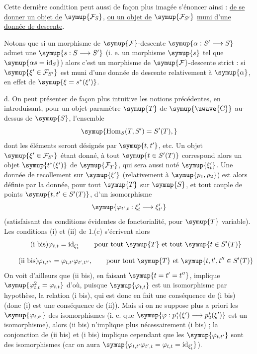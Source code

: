 Cette dernière condition peut aussi de façon plus imagée s'énoncer ainsi :
 \uline{de se donner un objet de} $\symup{\mathcal F_S}$, \uline{ou un objet de}
$\symup{\mathcal F_{S'}}$ \uline{muni d'une donnée de descente}.

Notons que si un morphisme de $\symup{\mathcal F}$-descente $\symup{\alpha:S'\longrightarrow S}$ admet une 
$\symup{s:S\longrightarrow S'}$ (i. e. un morphisme $\symup{s}$ tel que
$\symup{\alpha s=\operatorname{id}_S}$) alors c'est un morphisme de
$\symup{\mathcal F}$-descente strict : si $\symup{\xi'\in\mathcal F_{S'}}$ est muni d'une donnée de
descente relativement à $\symup{\alpha}$,  en effet de
$\symup{\xi=s^*(\xi')}$.

\medskip\noindent
d. On peut présenter de façon plus intuitive les notions précédentes, en
introduisant, pour un objet-paramètre $\symup{T}$ de $\symup{\text{\uwave{C}}}$ au-dessus de $\symup{S}$,
l'ensemble
\[
  \symup{\operatorname{Hom}_S(T,S')=S'(T),}
\]
dont les éléments seront désignés par $\symup{t,t'}$, etc. Un objet
$\symup{\xi'\in\mathcal F_{S'}}$ étant donné, à tout $\symup{t\in S'(T)}$ correspond alors un
objet $\symup{t^*(\xi')}$ de $\symup{\mathcal F_T}$, qui sera aussi noté $\symup{\xi'_t}$. Une donnée de
recollement sur $\symup{\xi'}$ (relativement à $\symup{p_1,p_2}$) est alors définie par la
donnée, pour tout $\symup{T}$ sur $\symup{S}$, et tout couple de points
$\symup{t,t'\in S'(T)}$, d'un isomorphisme
\[
  \symup{\varphi_{t',t}:\xi'_t\longrightarrow\xi'_{t'}}
\]
(satisfaisant des conditions évidentes de fonctorialité, pour $\symup{T}$ variable).
Les conditions (i) et (ii) de 1.(c) s'écrivent alors
\[
  \tag{i bis}
  \varphi_{t,t}=\operatorname{id}_{\xi'_t}
  \qquad\text{pour tout $\symup{T}$ et tout $\symup{t\in S'(T)}$}
\]

\[
  \tag{ii bis}
  \varphi_{t,t''}=\varphi_{t,t'}\varphi_{t',t''},
  \qquad\text{pour tout $\symup{T}$ et $\symup{t,t',t''\in S'(T)}$}
\]
On voit d'ailleurs que (ii bis), en faisant $\symup{t=t'=t''}$, implique
$\symup{\varphi_{t,t}^2=\varphi_{t,t}}$ d'où, puisque $\symup{\varphi_{t,t}}$ est un
isomorphisme par hypothèse, la relation (i bis), qui est donc en fait une
conséquence de (i bis) (donc (i) est une conséquence de (ii)). Mais si on ne
suppose plus a priori les $\symup{\varphi_{t,t'}}$ des isomorphismes (i. e. que
$\symup{\varphi:p_1^*(\xi')\longrightarrow p_2^*(\xi')}$ est un isomorphisme), alors
(ii bis) n'implique plus nécessairement (i bis) ; la conjonction de (ii bis) et
(i bis) implique cependant que les $\symup{\varphi_{t,t'}}$ sont des isomorphismes (car
on aura
$\symup{\varphi_{t,t'}\varphi_{t',t}=\varphi_{t,t}=\operatorname{id}_{\xi'_t}}$).


